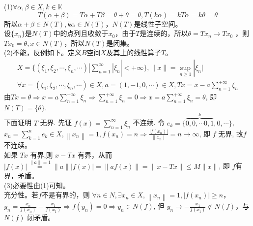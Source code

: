 \documentclass[lang=cn,newtx,10pt,scheme=chinese,thmcnt=chapter]{elegantbook}
\begin{document}
\begin{solution}
(1)$\forall \alpha,\beta\in {X},k\in \mathbb{K}$
\[T(\alpha+\beta)=T\alpha+T\beta=\theta+\theta=\theta,T(k\alpha)=kT\alpha=k\theta=\theta\]
所以$\alpha+\beta \in N(T),k\alpha\in N(T)$，$N(T)$是线性子空间。\\
设$\{x_n\}$是$N(T)$中的点列且收敛于$x_0$，由于$T$是连续的，所以$\theta=Tx_n\rightarrow Tx_0$
，则$Tx_0=\theta ,x\in N(T)$，所以$N(T)$是闭集。\\
(2)不能，反例如下。定义$B$空间$X$及其上的线性算子$T$。
\begin{equation*}
    \begin{aligned}
    X=\{(\xi_1,\xi_2,\cdots,\xi_n,\cdots)|\sum\limits_{n=1}^{\infty}|\xi_n|<+\infty\},\|x\|=\sup_{n\geqslant 1}|\xi_n|\\
    \forall x=(\xi_1,\xi_2,\cdots,\xi_n,\cdots)\in X,a  =(1,-1,0, \cdots) \in X ,Tx=x-a\sum\limits_{n=1}^{+\infty}\xi_n
    \end{aligned}
\end{equation*}
由$T x=\theta \Rightarrow x=a \sum\limits_{n=1}^{+\infty}\xi_n \Rightarrow \sum\limits_{n=1}^{+\infty}\xi_n=0 \Rightarrow x=a \sum\limits_{n=1}^{+\infty}\xi_n=\theta$, 即 $N(T)=\{\theta\}$. \\
下面证明 $T$ 无界. 先证 $f(x)=\sum\limits_{n=1}^{\infty} \xi_n$ 不连续. 令 $e_k=\{\overbrace{0,0, \cdots 0,1}^k, 0, \cdots\}$,
$x_n=\sum\limits_{k=1}^n e_k \in X ,\left\|x_n\right\|=1, f\left(x_n\right)=n \Rightarrow \frac{\left|f\left(x_n\right)\right|}{\| x_n \mid}=n \rightarrow \infty$, 即 $f$ 无界, 故$f$
不连续。\\
如果 $T x$ 有界,则 $x-T x$ 有界，从而
$|f(x)| \stackrel{\| a \|=1}{=}\|a\|| f(x) |=\|a f(x)\|=\|x-T x\| \leqslant M\|x\|$, 即 $f$有界，矛盾。\\
(3)必要性由(1)可知。
\\充分性。若$f$不是有界的，则
$\forall n \in N , \exists x_n\in{X},\left\|x_n\right\|=1,\left|f\left(x_n\right)\right| \geqslant n$，$y_n=\frac{x_n}{f\left(x_n\right)}-\frac{x_1}{f\left(x_1\right)} \Rightarrow f\left(y_n\right)=0 \Rightarrow y_n \in N(f)$, 但 $y_n \rightarrow-\frac{x_1}{f\left(x_1\right)} \notin N(f)$，与 $N(f)$ 闭矛盾。
\end{solution}
\end{document}
